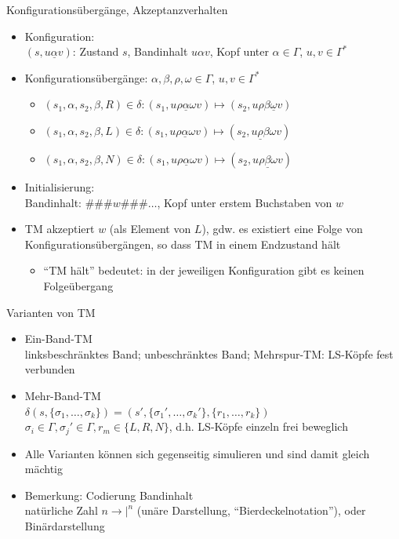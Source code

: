 \begin{frame}{Konfigurationsübergänge, Akzeptanzverhalten}
	\begin{itemize}
		\item Konfiguration:\\
		$(s, u\underline{\alpha}v)$: Zustand $s$, Bandinhalt $u\alpha v$, Kopf unter $\alpha \in \Gamma$, $u,v \in \Gamma^*$
		\item Konfigurationsübergänge: $\alpha, \beta, \rho, \omega \in \Gamma$, $u, v \in \Gamma^*$
		\begin{itemize}
			\item $(s_1, \alpha, s_2, \beta, R) \in \delta:$\qquad $(s_1, u\rho\underline{\alpha}\omega v) \mapsto (s_2, u\rho\beta\underline{\omega}v)$
			\item $(s_1, \alpha, s_2, \beta, L) \in \delta:$\qquad $(s_1, u\rho\underline{\alpha}\omega v) \mapsto (s_2, u\underline{\rho}\beta\omega v)$
			\item $(s_1, \alpha, s_2, \beta, N) \in \delta:$\qquad $(s_1, u\rho\underline{\alpha}\omega v) \mapsto (s_2, u\rho\underline{\beta}\omega v)$
		\end{itemize}
		\item Initialisierung:\\
		Bandinhalt: $\#\#\# w\#\#\#\ldots$, Kopf unter erstem Buchstaben von $w$
		\item TM akzeptiert $w$ (als Element von $L$), gdw. es existiert eine Folge von Konfigurationsübergängen, so dass TM in einem Endzustand hält
		\begin{itemize}
			\item "`TM hält"' bedeutet: in der jeweiligen Konfiguration gibt es keinen Folgeübergang
		\end{itemize}
	\end{itemize}
\end{frame}

\begin{frame}{Varianten von TM}
	\begin{itemize}
		\item Ein-Band-TM\\
		linksbeschränktes Band; unbeschränktes Band; Mehrspur-TM: LS-Köpfe fest verbunden
		\item Mehr-Band-TM\\
		$\delta(s, \{\sigma_1, \ldots, \sigma_k\}) = (s', \{\sigma_1', \ldots, \sigma_k'\},\{r_1,\ldots,r_k\})$\\
		$\sigma_i \in \Gamma, \sigma_j' \in \Gamma, r_m \in \{L, R, N\}$, d.h. LS-Köpfe einzeln frei beweglich
		\item Alle Varianten können sich gegenseitig simulieren und sind damit gleich mächtig
		\item Bemerkung: Codierung Bandinhalt\\
		natürliche Zahl $n \rightarrow |^n$ (unäre Darstellung, "`Bierdeckelnotation"'), oder Binärdarstellung
	\end{itemize}
\end{frame}

